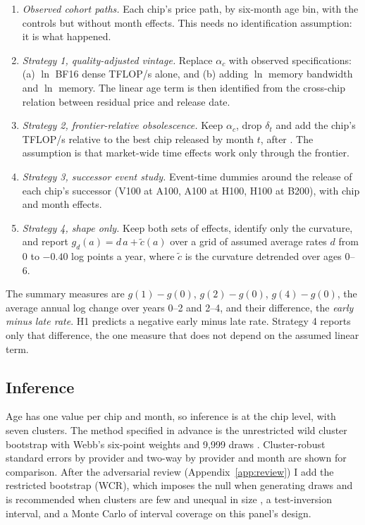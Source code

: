 \begin{enumerate}
\item \emph{Observed cohort paths.} Each chip's price path, by six-month age bin, with the controls
but without month effects. This needs no identification assumption: it is what happened.
\item \emph{Strategy 1, quality-adjusted vintage.} Replace $\alpha_c$ with observed specifications:
(a) $\ln$ BF16 dense TFLOP/s alone, and (b) adding $\ln$ memory bandwidth and $\ln$ memory. The
linear age term is then identified from the cross-chip relation between residual price and release
date.
\item \emph{Strategy 2, frontier-relative obsolescence.} Keep $\alpha_c$, drop $\delta_t$ and add the
chip's TFLOP/s relative to the best chip released by month $t$, after \citet{geske2007computers}.
The assumption is that market-wide time effects work only through the frontier.
\item \emph{Strategy 3, successor event study.} Event-time dummies around the release of each
chip's successor (V100 at A100, A100 at H100, H100 at B200), with chip and month effects.
\item \emph{Strategy 4, shape only.} Keep both sets of effects, identify only the curvature, and
report $g_d(a) = d\,a + \tilde c(a)$ over a grid of assumed average rates $d$ from 0 to $-0.40$
log points a year, where $\tilde c$ is the curvature detrended over ages 0--6.
\end{enumerate}

The summary measures are $g(1)-g(0)$, $g(2)-g(0)$, $g(4)-g(0)$, the average annual log change over
years 0--2 and 2--4, and their difference, the \emph{early minus late rate}. H1 predicts a negative
early minus late rate. Strategy 4 reports only that
difference, the one measure that does not depend on the assumed linear term.

\subsection{Inference}

Age has one value per chip and month, so inference is at the chip level, with seven clusters. The
method specified in advance is the unrestricted wild cluster bootstrap with Webb's six-point weights and
9,999 draws \citep{cameron2008bootstrap, webb2023reworking}. Cluster-robust standard errors by
provider and two-way by provider and month are shown for comparison. After the adversarial review
(Appendix~\ref{app:review}) I add the restricted bootstrap (WCR), which imposes the null when generating draws and is
recommended when clusters are few and unequal in size \citep{mackinnon2017wild,
mackinnon2023cluster}, a test-inversion interval, and a Monte Carlo of interval coverage on this
panel's design.

